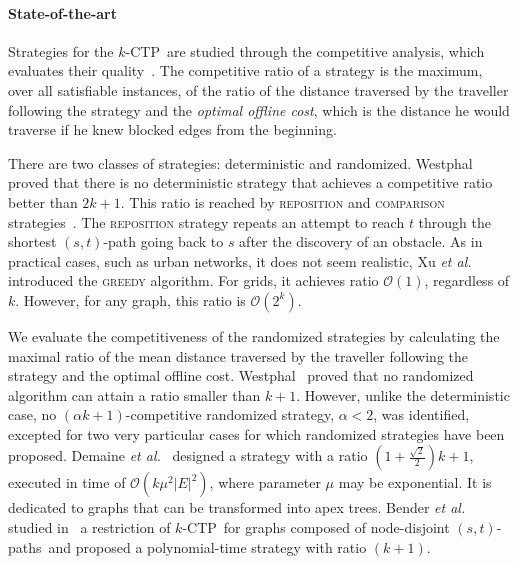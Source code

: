 \documentclass[preprint]{elsarticle}
\newcommand{\kctp}{$k$-CTP}
\newcommand{\card}[1]{\left| #1 \right|}
\newcommand{\stpath}{$(s,t)$-path}
\newcommand{\stpaths}{$(s,t)$-paths}
\begin{document}
\paragraph{State-of-the-art}
Strategies for the \kctp ~are studied through the competitive analysis, which evaluates their quality~\cite{BoEl98}. The competitive ratio of a strategy is the maximum, over all satisfiable instances, of the ratio of the distance traversed by the traveller following the strategy and the \textit{optimal offline cost}, which is the distance he would traverse if he knew blocked edges from the beginning. 

There are two classes of strategies: deterministic and randomized. Westphal~\cite{We08} proved that there is no deterministic strategy that achieves a competitive ratio better than $2k+1$. This ratio is reached by \textsc{reposition} and \textsc{comparison} strategies~\cite{We08,XuHuSuZh09}. The \textsc{reposition} strategy repeats an attempt to reach $t$ through the shortest \stpath{} going back to $s$ after the discovery of an obstacle. As in practical cases, such as urban networks, it does not seem realistic, Xu {\em et al.\/}~\cite{XuHuSuZh09} introduced the \textsc{greedy} algorithm. For grids, it achieves ratio $\mathcal{O}\left(1\right)$, regardless of $k$. However, for any graph, this ratio is $\mathcal{O}\left(2^k\right)$.

We evaluate the competitiveness of the randomized strategies by calculating the maximal ratio of the mean distance traversed by the traveller following the strategy and the optimal offline cost. Westphal~\cite{We08} proved that no randomized algorithm can attain a ratio smaller than $k+1$. However, unlike the deterministic case, no $\left(\alpha k+1\right)$-competitive randomized strategy, $\alpha < 2$, was identified, excepted for two very particular cases for which randomized strategies have been proposed. Demaine {\em et al.\/}~\cite{DeHuLiSa14} designed a strategy with a ratio $\left(1+\frac{\sqrt{2}}{2}\right)k+1$, executed in time of $\mathcal{O}\left(k\mu^2\card{E}^2\right)$, where parameter $\mu$ may be exponential. It is dedicated to graphs that can be transformed into apex trees. 
Bender {\em et al.\/} studied in~\cite{BeWe15} a restriction of \kctp ~for graphs composed of node-disjoint \stpaths ~and proposed a polynomial-time strategy with ratio $\left(k+1\right)$. 
\end{document}

